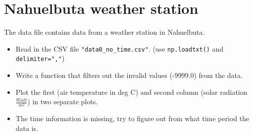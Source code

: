 \section{Nahuelbuta weather station}

The data file contains data from a weather station in Nahuelbuta.

\begin{itemize}
    \item Read in the CSV file \verb|"data0_no_time.csv"|. (use \verb|np.loadtxt()| and \verb|delimiter=","|)
    \item Write a function that filters out the invalid values (-9999.0) from the data.
    \item Plot the first (air temperature in deg C) and second column (solar radiation $\frac{Watt}{m^2}$) in two separate plots.
    \item The time information is missing, try to figure out from what time period the data is.
\end{itemize}
